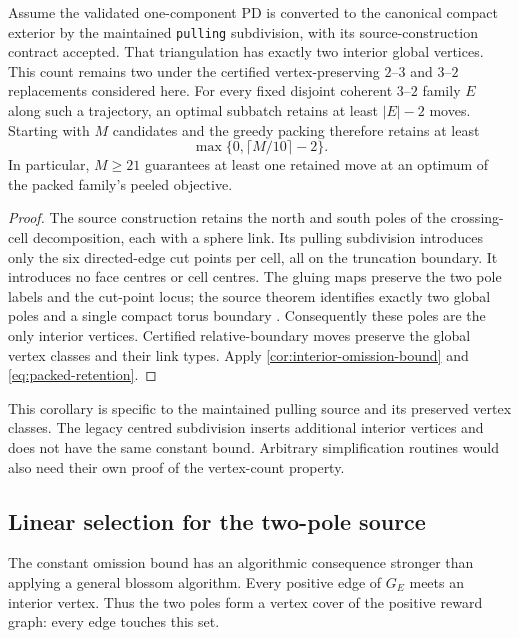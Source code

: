 \begin{corollary}
\label{cor:two-pole-source}
Assume the validated one-component PD is converted to the canonical
compact exterior by the maintained \texttt{pulling} subdivision,
with its source-construction contract accepted. That triangulation
has exactly two interior global vertices. This count remains two
under the certified vertex-preserving $2$--$3$ and $3$--$2$
replacements considered here. For every fixed disjoint coherent
$3$--$2$ family $E$ along such a trajectory, an optimal subbatch
retains at least $|E|-2$ moves. Starting with $M$ candidates and
the greedy packing therefore retains at least
\[
 \max\{0,\lceil M/10\rceil-2\}.
\]
In particular, $M\ge21$ guarantees at least one retained move
at an optimum of the packed family's peeled objective.
\end{corollary}
\begin{proof}
The source construction retains the north and south poles of
the crossing-cell decomposition, each with a sphere link. Its
pulling subdivision introduces only the six directed-edge cut
points per cell, all on the truncation boundary. It introduces
no face centres or cell centres. The gluing maps preserve the
two pole labels and the cut-point locus; the source theorem
identifies exactly two global poles and a single compact torus
boundary \cite{ProveItSource}. Consequently these poles are the
only interior vertices. Certified relative-boundary moves preserve
the global vertex classes and their link types. Apply
\cref{cor:interior-omission-bound} and
\eqref{eq:packed-retention}.
\end{proof}

This corollary is specific to the maintained pulling source and
its preserved vertex classes. The legacy centred subdivision
inserts additional interior vertices and does not have the same
constant bound. Arbitrary simplification routines would also
need their own proof of the vertex-count property.

\subsection{Linear selection for the two-pole source}
\label{sec:two-pole-linear-selection}

The constant omission bound has an algorithmic consequence stronger
than applying a general blossom algorithm. Every positive edge of
$G_E$ meets an interior vertex. Thus the two poles form a vertex
cover of the positive reward graph: every edge touches this set.

